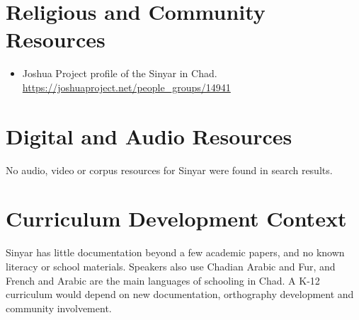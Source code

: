 \documentclass[12pt]{article}
\begin{document}
\section{Religious and Community Resources}
\begin{itemize}
\item Joshua Project profile of the Sinyar in Chad. \url{https://joshuaproject.net/people_groups/14941}
\end{itemize}

\section{Digital and Audio Resources}
No audio, video or corpus resources for Sinyar were found in search results.

\section{Curriculum Development Context}
Sinyar has little documentation beyond a few academic papers, and no known literacy or school materials. Speakers also use Chadian Arabic and Fur, and French and Arabic are the main languages of schooling in Chad. A K-12 curriculum would depend on new documentation, orthography development and community involvement.
\end{document}
